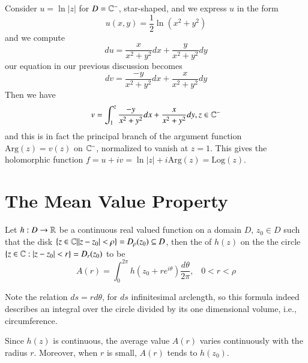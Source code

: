 \documentclass[12pt, a4paper, oneside, openright, titlepage]{book}
\begin{document}
\begin{eg}
    Consider $u = \ln|z|$ for $D = \mathbb C^-$, star-shaped, and we express $u$ in the form \begin{equation*}
        u(x,y) = \frac{1}{2}\ln(x^2+y^2)
    \end{equation*}
    and we compute \begin{equation*}
        du = \frac{x}{x^2+y^2}dx + \frac{y}{x^2+y^2}dy
    \end{equation*}
    our equation in our previous discussion becomes \begin{equation*}
        dv = \frac{-y}{x^2+y^2}dx + \frac{x}{x^2+y^2}dy
    \end{equation*}
    Then we have \begin{equation*}
        v = \int_1^z\frac{-y}{x^2+y^2}dx + \frac{x}{x^2+y^2}dy, z \in \mathbb C^-
    \end{equation*}
    and this is in fact the principal branch of the argument function $\text{Arg}(z) = v(z)$ on $\mathbb C^-$, normalized to vanish at $z = 1$. This gives the holomorphic function $f = u+iv = \ln|z|+i\text{Arg}(z)=\text{Log}(z)$.
\end{eg}


\section{The Mean Value Property}

\begin{defn}
    Let $h:D\rightarrow \mathbb R$ be a continuous real valued function on a domain $D$, $z_0 \in D$ such that the disk $\{z \in \mathbb C\vert |z-z_0| < \rho\} = D_{\rho}(z_0)\subseteq D$, then the  of $h(z)$ on the the circle $\{z \in \mathbb C:|z-z_0| < r\} = D_r(z_0)$ to be \begin{equation*}
        A(r) = \int_0^{2\pi}h(z_0+re^{i\theta})\frac{d\theta}{2\pi}, \;\;\; 0 < r < \rho 
    \end{equation*}
\end{defn}
Note the relation $ds = rd\theta$, for $ds$ infinitesimal arclength, so this formula indeed describes an integral over the circle divided by its one dimensional volume, i.e., circumference.

Since $h(z)$ is continuous, the average value $A(r)$ varies continuously with the radius $r$. Moreover, when $r$ is small, $A(r)$ tends to $h(z_0)$.
\end{document}
